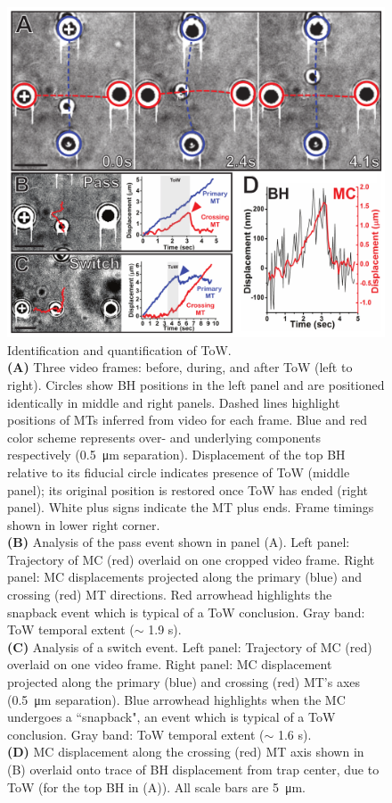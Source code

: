 \begin{figure}
\centering
\includegraphics[scale=.7]{project1/Fig_2FINAL}
\caption[Identification and quantification of ToW]{Identification and quantification of ToW. \\
\textbf{(A)} Three video frames: before, during, and after ToW (left to right). Circles show BH
positions in the left panel and are positioned identically in middle and right panels. Dashed lines highlight positions of MTs inferred from video for each frame. Blue and red color scheme represents over- and underlying components respectively (\SI{.5}{\micro\meter} separation). Displacement of the top BH relative to its fiducial circle indicates presence of ToW (middle panel); its original position is restored once ToW has ended (right panel). White plus signs indicate the MT plus ends. Frame timings shown in lower right corner. \\
\textbf{(B)} Analysis of the pass event shown in panel (A). Left panel: Trajectory of MC (red) overlaid on one cropped video frame. Right panel: MC displacements projected along the primary (blue) and crossing (red) MT directions. Red arrowhead highlights the snapback event which is typical of a ToW conclusion. Gray band: ToW temporal extent ($\sim$ 1.9 s). \\
\textbf{(C)} Analysis of a switch event. Left panel: Trajectory of MC (red) overlaid on one video frame. Right panel: MC displacement projected along the primary (blue) and crossing (red) MT's axes (\SI{.5}{\micro\meter} separation). Blue arrowhead highlights when the MC undergoes a ``snapback", an event which is typical of a ToW conclusion. Gray band: ToW temporal extent ($\sim$ 1.6 s). \\
\textbf{(D)} MC displacement along the crossing (red) MT axis shown in (B) overlaid onto trace of BH displacement from trap center, due to ToW (for the top BH in (A)). All scale bars are \SI{5}{\micro\meter}.}
\label{fig:2}
\end{figure}


